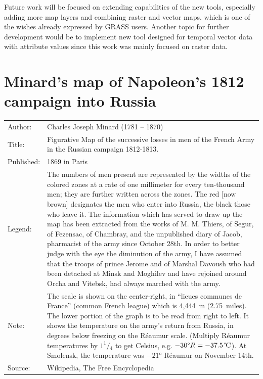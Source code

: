 \documentclass[a4paper,12pt,oneside]{book}
\begin{document}
Future work will be focused on extending capabilities of the new tools,
especially adding more map layers and combining raster and vector maps.
which is one of the wishes already expressed by GRASS users.
Another topic for further development would be to implement new tool
designed for temporal vector data with attribute values since this work
was mainly focused on raster data. 




\newpage
\clearpage
{}
{}
\printbibliography

\cleardoublepage
{}
{}
\listoffigures
\cleardoublepage
{}
{}
\listoftables

\appendix
\chapter{Minard’s map of Napoleon’s 1812 campaign into Russia}
\label{appdx:minard}
\begin{singlespace}
\begin{center}
\setlength{\extrarowheight}{3pt}
 \begin{tabularx}{\linewidth}{lX}
 Author:& Charles Joseph Minard (1781 -- 1870)\\
 Title:& Figurative Map of the successive losses in men of the French Army in the Russian campaign 1812-1813.\\
 Published: & 1869 in Paris \\
 Legend:& The numbers of men present are represented by the widths of the colored zones
 at a rate of one millimeter for every ten-thousand men; they are further written across the zones.
 The red [now brown] designates the men who enter into Russia, the black those who leave it.
 The information which has served to draw up the map has been extracted from
 the works of M. M. Thiers, of Segur, of Fezensac, of Chambray, and the unpublished
 diary of Jacob, pharmacist of the army since October 28th.
 In order to better judge with the eye the diminution of the army,
 I have assumed that the troops of prince Jerome and of Marshal Davoush who had been detached
 at Minsk and Moghilev and have rejoined around Orcha and Vitebsk, had always marched with the army.\\
 Note: & 
The scale is shown on the center-right, in ``lieues communes de France'' (common French league)
which is 4,444~m (2.75~miles).
The lower portion of the graph is to be read from right to left. It shows the temperature on the army's return
from Russia, in degrees below freezing on the Réaumur scale. (Multiply Réaumur temperatures by $1 ^1\!/\!_4$ to get Celsius,
e.g. $-30\text{\textdegree} R = -37.5\,\text{\textcelsius}$).
At Smolensk, the temperature was $-21$° Réaumur on November 14th.\\
Source:& Wikipedia, The Free Encyclopedia
\end{tabularx}
\end{center}
\end{singlespace}
\end{document}
